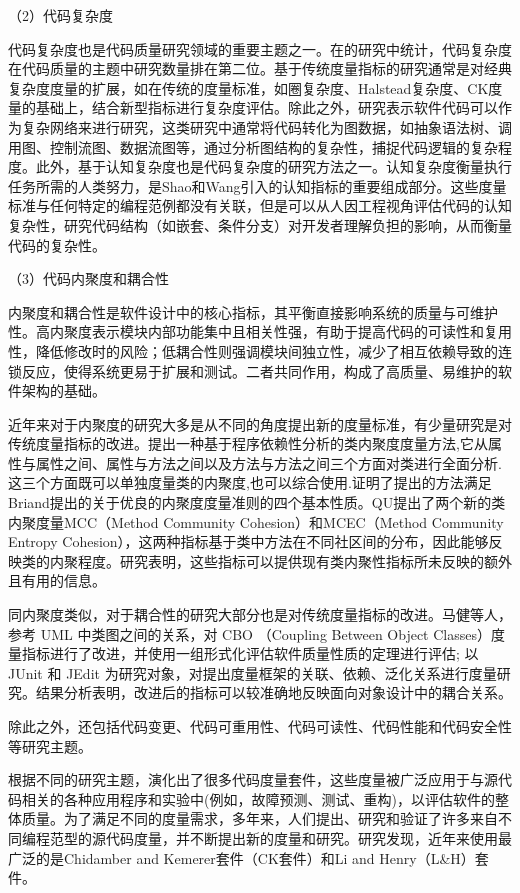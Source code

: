 （2）代码复杂度

代码复杂度也是代码质量研究领域的重要主题之一。在\cite{NUNEZVARELA2017164}的研究中统计，代码复杂度在代码质量的主题中研究数量排在第二位。基于传统度量指标的研究通常是对经典复杂度度量的扩展，如在传统的度量标准，如圈复杂度、Halstead复杂度、CK度量的基础上，结合新型指标进行复杂度评估。除此之外，研究表示软件代码可以作为复杂网络来进行研究\cite{2015Exploring, 2012A}，这类研究中通常将代码转化为图数据，如抽象语法树、调用图、控制流图、数据流图等，通过分析图结构的复杂性，捕捉代码逻辑的复杂程度。此外，基于认知复杂度也是代码复杂度的研究方法之一。认知复杂度衡量执行任务所需的人类努力\cite{2012Framework, 2012Asuite}，是Shao和Wang\cite{2010Assessing}引入的认知指标的重要组成部分。这些度量标准与任何特定的编程范例都没有关联，但是可以从人因工程视角评估代码的认知复杂性，研究代码结构（如嵌套、条件分支）对开发者理解负担的影响，从而衡量代码的复杂性。


（3）代码内聚度和耦合性

内聚度和耦合性是软件设计中的核心指标，其平衡直接影响系统的质量与可维护性。高内聚度表示模块内部功能集中且相关性强，有助于提高代码的可读性和复用性，降低修改时的风险；低耦合性则强调模块间独立性，减少了相互依赖导致的连锁反应，使得系统更易于扩展和测试。二者共同作用，构成了高质量、易维护的软件架构的基础。

近年来对于内聚度的研究大多是从不同的角度提出新的度量标准，有少量研究是对传统度量指标的改进。\cite{陈振强2003}提出一种基于程序依赖性分析的类内聚度度量方法,它从属性与属性之间、属性与方法之间以及方法与方法之间三个方面对类进行全面分析.这三个方面既可以单独度量类的内聚度,也可以综合使用.证明了提出的方法满足Briand提出的关于优良的内聚度度量准则的四个基本性质。QU\cite{QU2015193}提出了两个新的类内聚度量MCC（Method Community Cohesion）和MCEC（Method Community Entropy Cohesion），这两种指标基于类中方法在不同社区间的分布，因此能够反映类的内聚程度。研究表明，这些指标可以提供现有类内聚性指标所未反映的额外且有用的信息。

同内聚度类似，对于耦合性的研究大部分也是对传统度量指标的改进。马健等人\cite{马健2018}，参考 UML 中类图之间的关系，对 CBO （Coupling Between Object Classes）度量指标进行了改进，并使用一组形式化评估软件质量性质的定理进行评估; 以 JUnit 和 JEdit 为研究对象，对提出度量框架的关联、依赖、泛化关系进行度量研究。结果分析表明，改进后的指标可以较准确地反映面向对象设计中的耦合关系。


除此之外，还包括代码变更、代码可重用性、代码可读性、代码性能和代码安全性等研究主题。

根据不同的研究主题，演化出了很多代码度量套件，这些度量被广泛应用于与源代码相关的各种应用程序和实验中(例如，故障预测、测试、重构)，以评估软件的整体质量。为了满足不同的度量需求，多年来，人们提出、研究和验证了许多来自不同编程范型的源代码度量，并不断提出新的度量和研究。研究发现\cite{Ardito2020}，近年来使用最广泛的是Chidamber and Kemerer套件（CK套件）和Li and Henry（L&H）套件。



